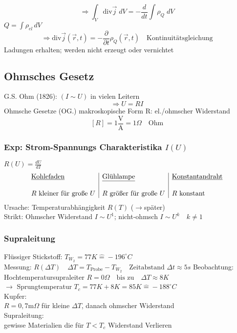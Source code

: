 \documentclass[titlepage,12pt,a4paper,ngerman]{report}
\newcommand{\tx}[1]{\textrm{#1}}
\begin{document}

$$\Rightarrow \int_V \tx{div} \vec{j} \;dV = - \frac{d}{dt} \int \rho_Q \;dV$$
$ Q = \int \rho_{el} \, dV$
$$\Rightarrow \boxed{\tx{div} \vec{j}(\vec{r},t) = -\frac{\partial}{\partial t} \rho_Q (\vec{r},t)}\quad \tx{Kontinuitätsgleichung}$$
Ladungen erhalten; werden nicht erzeugt oder vernichtet
\subsection{Ohmsches Gesetz}
G.S. Ohm (1826): $(I \sim U)$ in vielen Leitern
$$\Rightarrow \boxed{U = R I}$$
Ohmsche Gesetze (OG.) makroskopische Form
R: el./ohmscher Widerstand $$[R] = 1 \frac{\tx{V}}{\tx{A}} = 1 \Omega \quad \tx{Ohm}$$

\subsubsection{Exp: Strom-Spannungs Charakteristika $I(U)$}
$R(U) = \frac{dU}{dI}$\\
$$\begin{array}{l|l|l}
\tx{\underline{Kohlefaden}} & \tx{\underline{Glühlampe}} & \tx{\underline{Konstantandraht}}\\
&&\\
R \tx{ kleiner für große } U & R \tx{ größer für große } U & R \tx{ konstant} \\
\end{array}$$
Ursache: Temperaturabhängigkeit $R(T)$ ($\rightarrow
$später)\\
Strikt: Ohmscher Widerstand $I\sim U^1$; nicht-ohmsch $I\sim U^k \quad k \neq 1$
\subsubsection{Supraleitung}
Flüssiger Stickstoff: $T_{W_2} = 77K \widehat{=} - 196^\circ C$\\
Messung: $R(\Delta T) \quad \Delta T = T_{\tx{Probe}} - T_{W_2} \quad \tx{Zeitabstand } \Delta t \approx 5s$
Beobachtung:\\
Hochtemperatursupraleiter $R = 0\Omega \quad \tx{bis zu} \quad \Delta T \approx 8 K$\\
$\rightarrow $ Sprungtemperatur $T_c = 77K + 8 K = 85 K \widehat{=} -188^\circ C$\\
Kupfer:\\
$R = 0,7 \tx{m}\Omega$ für kleine $\Delta T$, danach ohmscher Widerstand\\
Supraleitung:\\ gewisse Materialien die für $T<T_c$ Widerstand Verlieren
\end{document}

